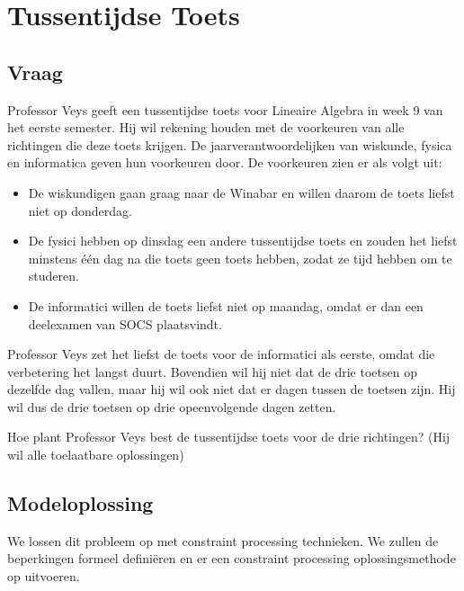 \documentclass[alternative-exam.tex]{subfiles}
\begin{document}
\chapter{Tussentijdse Toets}

\section{Vraag}
Professor Veys geeft een tussentijdse toets voor Lineaire Algebra in week 9 van het eerste semester.
Hij wil rekening houden met de voorkeuren van alle richtingen die deze toets krijgen. De jaarverantwoordelijken van wiskunde, fysica en informatica geven hun voorkeuren door. De voorkeuren zien er als volgt uit:
\begin{itemize}
\item
De wiskundigen gaan graag naar de Winabar en willen daarom de toets liefst niet op donderdag. 
\item De fysici hebben op dinsdag een andere tussentijdse toets en zouden het liefst minstens \'e\'en dag na die toets geen toets hebben, zodat ze tijd hebben om te studeren. 
\item De informatici willen de toets liefst niet op maandag, omdat er dan een deelexamen van SOCS plaatsvindt.
\end{itemize}
Professor Veys zet het liefst de toets voor de informatici als eerste, omdat die verbetering het langst duurt. Bovendien wil hij niet dat de drie toetsen op dezelfde dag vallen, maar hij wil ook niet dat er dagen tussen de toetsen zijn. Hij wil dus de drie toetsen op drie opeenvolgende dagen zetten.

\noindent Hoe plant Professor Veys best de tussentijdse toets voor de drie richtingen? (Hij wil alle toelaatbare oplossingen)

\section{Modeloplossing}
We lossen dit probleem op met constraint processing technieken. We zullen de beperkingen formeel defini\"eren en er een constraint processing oplossingsmethode op uitvoeren.
\end{document}

